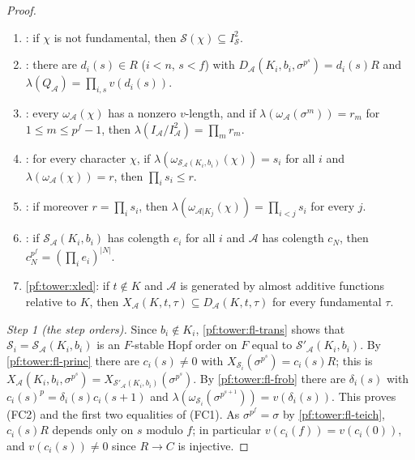 \begin{proof}
\begin{enumerate}[label=(\roman*)]
  \ref{pf:tower:fl-frob}, $\mathcal S$ is spanned by the products $\prod_{s<f}(c(s)\sigma^{p^s})^{e_s}$, $0\le e_s<p$, and
  if $\mathcal S$ has colength $c$ then $c^2=\bigl(\prod_{s<f}v(c(s))\bigr)^{p^f(p-1)}$.
\item\label{pf:tower:fl-nonf} : if $\chi$ is not
  fundamental, then $\mathcal S(\chi)\subseteq I_{\mathcal S}^2$.
\item\label{pf:tower:fl-len} : there are $d_i(s)\in R$
  ($i<n$, $s<f$) with $D_{\mathcal A}(K_i,b_i,\sigma^{p^s})=d_i(s)R$ and $\lambda(Q_{\mathcal A})=\prod_{i,s}v(d_i(s))$.
\item\label{pf:tower:fl-cot} : every
  $\omega_{\mathcal A}(\chi)$ has a nonzero $v$-length, and if $\lambda(\omega_{\mathcal A}(\sigma^m))=r_m$ for
  $1\le m\le p^f-1$, then $\lambda(I_{\mathcal A}/I_{\mathcal A}^2)=\prod_mr_m$.
\item\label{pf:tower:fl-blen} : for every character $\chi$, if
  $\lambda(\omega_{\mathcal S_{\mathcal A}(K_i,b_i)}(\chi))=s_i$ for all $i$ and $\lambda(\omega_{\mathcal A}(\chi))=r$, then
  $\prod_is_i\le r$.
\item\label{pf:tower:fl-bcol} : if moreover $r=\prod_is_i$, then
  $\lambda(\omega_{\mathcal A|K_j}(\chi))=\prod_{i<j}s_i$ for every $j$.
\item\label{pf:tower:fl-bid} : if $\mathcal S_{\mathcal A}(K_i,b_i)$
  has colength $e_i$ for all $i$ and $\mathcal A$ has colength $c_N$, then $c_N^{p^f}=(\prod_ie_i)^{|N|}$.
\item\label{pf:tower:fl-gen} \cref{pf:tower:xled}: if $t\notin K$ and
  $\mathcal A$ is generated by almost additive functions relative to $K$, then
  $X_{\mathcal A}(K,t,\tau)\subseteq D_{\mathcal A}(K,t,\tau)$ for every fundamental $\tau$.
\end{enumerate}

\emph{Step 1 (the step orders).} Since $b_i\notin K_i$, \ref{pf:tower:fl-trans} shows that
$\mathcal S_i=\mathcal S_{\mathcal A}(K_i,b_i)$ is an $F$-stable Hopf order on $F$ equal to $\mathcal S'_{\mathcal A}(K_i,b_i)$.
By \ref{pf:tower:fl-princ} there are $c_i(s)\ne0$ with $X_{\mathcal S_i}(\sigma^{p^s})=c_i(s)R$; this is
$X_{\mathcal A}(K_i,b_i,\sigma^{p^s})=X_{\mathcal S'_{\mathcal A}(K_i,b_i)}(\sigma^{p^s})$. By \ref{pf:tower:fl-frob} there are
$\delta_i(s)$ with $c_i(s)^p=\delta_i(s)c_i(s+1)$ and $\lambda(\omega_{\mathcal S_i}(\sigma^{p^{s+1}}))=v(\delta_i(s))$. This
proves (FC2) and the first two equalities of (FC1). As $\sigma^{p^f}=\sigma$ by \ref{pf:tower:fl-teich}, $c_i(s)R$ depends only
on $s$ modulo $f$; in particular $v(c_i(f))=v(c_i(0))$, and $v(c_i(s))\ne0$ since $R\to C$ is injective.


\end{proof}
